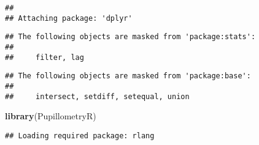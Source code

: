 \documentclass[]{book}
\newenvironment{Shaded}{\begin{snugshade}}{\end{snugshade}}
\newcommand{\KeywordTok}[1]{\textcolor[rgb]{0.13,0.29,0.53}{\textbf{#1}}}
\newcommand{\NormalTok}[1]{#1}
\begin{document}
\begin{verbatim}
## 
## Attaching package: 'dplyr'
\end{verbatim}

\begin{verbatim}
## The following objects are masked from 'package:stats':
## 
##     filter, lag
\end{verbatim}

\begin{verbatim}
## The following objects are masked from 'package:base':
## 
##     intersect, setdiff, setequal, union
\end{verbatim}

\begin{Shaded}
\begin{Highlighting}[]
\KeywordTok{library}\NormalTok{(PupillometryR)}
\end{Highlighting}
\end{Shaded}

\begin{verbatim}
## Loading required package: rlang
\end{verbatim}
\end{document}
